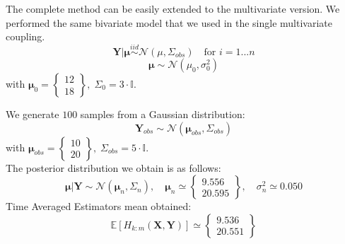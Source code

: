 \documentclass {article}
\begin{document}
The complete method can be easily extended to the multivariate version. We performed the same bivariate model that we used in the single multivariate coupling.
$$ \boldsymbol{Y} | \boldsymbol{\mu} \overset{iid}{\sim} \mathcal{N}(\mu, \Sigma_{obs} ) \quad \text{for } i = 1 ... n $$
$$ \boldsymbol{\mu}  \sim \mathcal{N}(\mu_0, \sigma_0^2)$$
with $\boldsymbol{\mu}_0 =
\begin{Bmatrix}    %
	12 \\
	18
\end{Bmatrix} 
, \; \Sigma_0 = 3 \cdot \mathbb{I}$.

We generate $100$ samples from a Gaussian distribution:
$$
\boldsymbol{Y}_{obs} \sim \mathcal{N}(\boldsymbol{\mu}_{obs}, \Sigma_{obs})
$$
with
$  \boldsymbol{\mu}_{obs} =
\begin{Bmatrix}  
	10 \\
	20
\end{Bmatrix}  
, \;  \Sigma_{obs}  = 5 \cdot \mathbb{I}
$.\\

The posterior distribution we obtain is as follows:
$$  \boldsymbol{\mu} | \boldsymbol{Y} \sim \mathcal{N}(\boldsymbol{\mu}_n, \Sigma_n), 
\quad \boldsymbol{\mu}_n \simeq \begin{Bmatrix}   
9.556 \\
20.595
\end{Bmatrix} ,
\quad
\sigma^2_n
\simeq 0.050  $$
Time Averaged Estimators mean obtained:
$$ \mathbb{E}[H_{k:m}(\boldsymbol{X},\boldsymbol{Y})] \simeq \begin{Bmatrix}   
9.536 \\
20.551
\end{Bmatrix}$$
\end{document}

